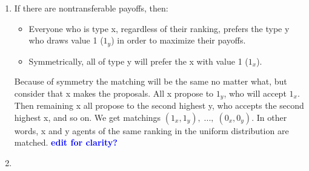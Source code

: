 \documentclass[]{article}
\newcommand{\fix} [1] {\textbf{\textcolor{blue}{#1}}} %
\begin{document}
\begin{enumerate}[label = (\alph*)]

\item If there are nontransferable payoffs, then:
\begin{itemize}
    \item Everyone who is type x, regardless of their ranking, prefers the type y who draws value 1 ($1_y$) in order to maximize their payoffs. 
    \item Symmetrically, all of type y will prefer the x with value 1 ($1_x$).  
\end{itemize}
Because of symmetry the matching will be the same no matter what, but consider that x makes the proposals. All x propose to $1_y$, who will accept $1_x$. Then remaining x all propose to the second highest y, who accepts the second highest x, and so on. We get matchings $(1_x,1_y),\; ... ,\; (0_x,0_y)$. In other words, x and y agents of the same ranking in the uniform distribution are matched. \fix{edit for clarity?}


\item


\end{enumerate}


\section{}
\end{document}
